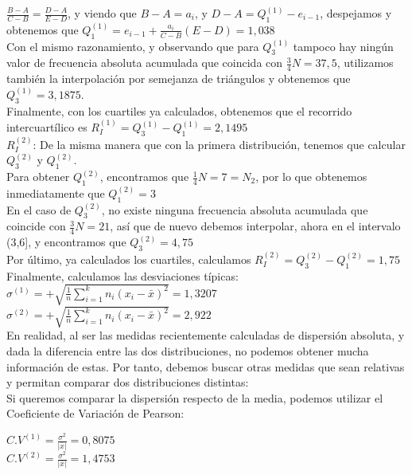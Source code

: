 \documentclass[a4paper,12pt]{article}
\begin{document}
\begin{itemize}
    $\frac{B-A}{C-B}=\frac{D-A}{E-D}$, y viendo que $B-A=a_i$, y $D-A = Q_1^{(1)}- e_{i-1}$, despejamos y obtenemos que $Q_1^{(1)}=e_{i-1}+\frac{a_i}{C-B}(E-D) = 1,038$\\
    Con el mismo razonamiento, y observando que para $Q_3^{(1)}$ tampoco hay ningún valor de frecuencia absoluta acumulada que coincida con $\frac{3}{4}N=37,5$, utilizamos también la interpolación por semejanza de triángulos y obtenemos que $Q_3^{(1)}=3,1875$.\\
    Finalmente, con los cuartiles ya calculados, obtenemos que el recorrido intercuartílico es  $R_{I}^{(1)}=Q_3^{(1)}-Q_1^{(1)} =2,1495$\\ 

    $R_{I}^{(2)}$: De la misma manera que con la primera distribución, tenemos que calcular $Q_3^{(2)}$ y $Q_1^{(2)}$.\\
    Para obtener $Q_1^{(2)}$, encontramos que $\frac{1}{4}N=7=N_2$, por lo que obtenemos inmediatamente que $Q_1^{(2)}=3$\\
    En el caso de $Q_3^{(2)}$, no existe ninguna frecuencia absoluta acumulada que coincide con $\frac{3}{4}N=21$, así que de nuevo debemos interpolar, ahora en el intervalo (3,6], y encontramos que $Q_3^{(2)}=4,75$\\
    Por último, ya calculados los cuartiles, calculamos $R_{I}^{(2)}=Q_3^{(2)}-Q_1^{(2)}=1,75$\\

    

    Finalmente, calculamos las desviaciones típicas:\\
    
    $\sigma^{(1)}=+\sqrt{\frac{1}{n}\sum\limits_{i=1}^kn_i(x_i-\bar x)^2} = 1,3207$\\
    $\sigma^{(2)}=+\sqrt{\frac{1}{n}\sum\limits_{i=1}^kn_i(x_i-\bar x)^2} = 2,922$\\

    En realidad, al ser las medidas recientemente calculadas de dispersión absoluta, y dada la diferencia entre las dos distribuciones, no podemos obtener mucha información de estas. Por tanto, debemos buscar otras medidas que sean relativas y permitan comparar dos distribuciones distintas:\\   

    Si queremos comparar la dispersión respecto de la media, podemos utilizar el Coeficiente de Variación de Pearson:
    
    $C.V^{(1)}=\frac{\sigma^2}{|\bar x|} = 0,8075$\\
    $C.V^{(2)}=\frac{\sigma^2}{|\bar x|} = 1,4753$\\


\end{itemize}
\end{document}
